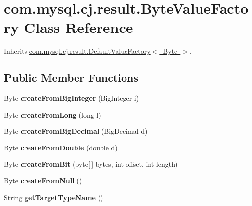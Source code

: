 \hypertarget{classcom_1_1mysql_1_1cj_1_1result_1_1_byte_value_factory}{}\section{com.\+mysql.\+cj.\+result.\+Byte\+Value\+Factory Class Reference}
\label{classcom_1_1mysql_1_1cj_1_1result_1_1_byte_value_factory}


Inherits \mbox{\hyperlink{classcom_1_1mysql_1_1cj_1_1result_1_1_default_value_factory}{com.\+mysql.\+cj.\+result.\+Default\+Value\+Factory$<$ Byte $>$}}.

\subsection*{Public Member Functions}
\begin{DoxyCompactItemize}
\item 
\mbox{\label{classcom_1_1mysql_1_1cj_1_1result_1_1_byte_value_factory_a326ae657497611999db6dba7beb21696}} 
Byte {\bfseries create\+From\+Big\+Integer} (Big\+Integer i)
\item 
\mbox{\label{classcom_1_1mysql_1_1cj_1_1result_1_1_byte_value_factory_adc6c1a9a4508dccd509e29e224d76c67}} 
Byte {\bfseries create\+From\+Long} (long l)
\item 
\mbox{\label{classcom_1_1mysql_1_1cj_1_1result_1_1_byte_value_factory_a9f56aca043f69abc0869d276135c77f9}} 
Byte {\bfseries create\+From\+Big\+Decimal} (Big\+Decimal d)
\item 
\mbox{\label{classcom_1_1mysql_1_1cj_1_1result_1_1_byte_value_factory_a000d77124a845e007445182a5a50997f}} 
Byte {\bfseries create\+From\+Double} (double d)
\item 
\mbox{\label{classcom_1_1mysql_1_1cj_1_1result_1_1_byte_value_factory_a3ba3035bf94783603fbe3c7badbd5414}} 
Byte {\bfseries create\+From\+Bit} (byte\mbox{[}$\,$\mbox{]} bytes, int offset, int length)
\item 
\mbox{\label{classcom_1_1mysql_1_1cj_1_1result_1_1_byte_value_factory_a64af0d441cace35013b75399774166b1}} 
Byte {\bfseries create\+From\+Null} ()
\item 
\mbox{\label{classcom_1_1mysql_1_1cj_1_1result_1_1_byte_value_factory_adc8d86c2f4f80b19aa6ba9715410be9f}} 
String {\bfseries get\+Target\+Type\+Name} ()
\end{DoxyCompactItemize}


